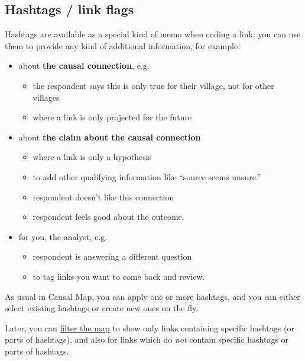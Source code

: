 \documentclass[
]{book}
\providecommand{\tightlist}{%
  \setlength{\itemsep}{0pt}\setlength{\parskip}{0pt}}
\begin{document}
\hypertarget{xhashtags}{%
\subsection{Hashtags / link flags}\label{xhashtags}}

Hashtags are available as a special kind of memo when coding a link: you can use them to provide any kind of additional information, for example:

\begin{itemize}
\tightlist
\item
  about \textbf{the causal connection}, e.g.

  \begin{itemize}
  \tightlist
  \item
    the respondent says this is only true for their village, not for other villages
  \item
    where a link is only projected for the future
  \end{itemize}
\item
  about \textbf{the claim about the causal connection}

  \begin{itemize}
  \tightlist
  \item
    where a link is only a hypothesis
  \item
    to add other qualifying information like ``source seems unsure.''
  \item
    respondent doesn't like this connection
  \item
    respondent feels good about the outcome.
  \end{itemize}
\item
  for you, the analyst, e.g.

  \begin{itemize}
  \tightlist
  \item
    respondent is answering a different question
  \item
    to tag links you want to come back and review.
  \end{itemize}
\end{itemize}

As usual in Causal Map, you can apply one or more hashtags, and you can either select existing hashtags or create new ones on the fly.

Later, you can \href{https://guide.causalmap.app/analysis.html\#filtering-the-map-by-link-hashtag-memo}{filter the map} to show only links containing specific hashtags (or parts of hashtags), and also for links which do \emph{not} contain specific hashtags or parts of hashtags.
\end{document}
